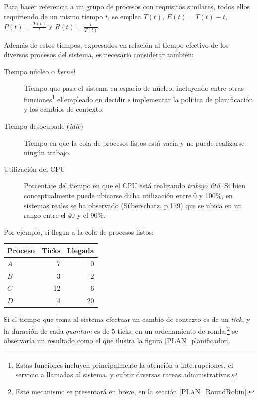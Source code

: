 \documentclass[11pt,fleqn]{book} %
\begin{document}
Para hacer referencia a un grupo de procesos con requisitos similares, todos
ellos requiriendo de un mismo tiempo $t$, se emplea $T(t)$,
$E(t) = T(t) - t$, $P(t) = \frac{T(t)}{t}$ y $R(t) = \frac{t}{T(t)}$.

Además de estos tiempos, expresados en relación al tiempo efectivo de
los diversos procesos del sistema, es necesario considerar también:

\begin{description}
\item[Tiempo núcleo o \emph{kernel}] Tiempo que pasa el sistema en espacio de
     núcleo, incluyendo entre otras funciones\footnote{Estas funciones
     incluyen principalmente la atención a interrupciones, el servicio
     a llamadas al sistema, y cubrir diversas tareas administrativas. }
     el empleado en decidir e implementar la política de planificación
     y los cambios de contexto.
\item[Tiempo desocupado (\emph{idle})] Tiempo en que la cola de procesos
     listos está vacía y no puede realizarse ningún trabajo.
\item[Utilización del CPU] Porcentaje del tiempo en que el CPU está
     realizando \emph{trabajo útil}. Si bien conceptualmente puede
     ubicarse dicha utilización entre 0 y 100\%, en sistemas reales se
     ha observado (Silberschatz, p.179) que se ubica en un rango
     entre el 40 y el 90\%.
\end{description}

Por ejemplo, si llegan a la cola de procesos listos:


\begin{center}
\begin{tabular}{lrr}
\hline
 Proceso  &  Ticks  &  Llegada  \\
\hline
 $A$      &      7  &        0  \\
 $B$      &      3  &        2  \\
 $C$      &     12  &        6  \\
 $D$      &      4  &       20  \\
\hline
\end{tabular}
\end{center}



Si el tiempo que toma al sistema efectuar un cambio de contexto es de
un \emph{tick}, y la duración de cada \emph{quantum} es de 5 ticks, en un
ordenamiento de ronda,\footnote{Este mecanismo se presentará en breve, en
la sección \ref{PLAN_RoundRobin}. } se observaría un resultado como el
que ilustra la figura \ref{PLAN_planificador}.
\end{document}
